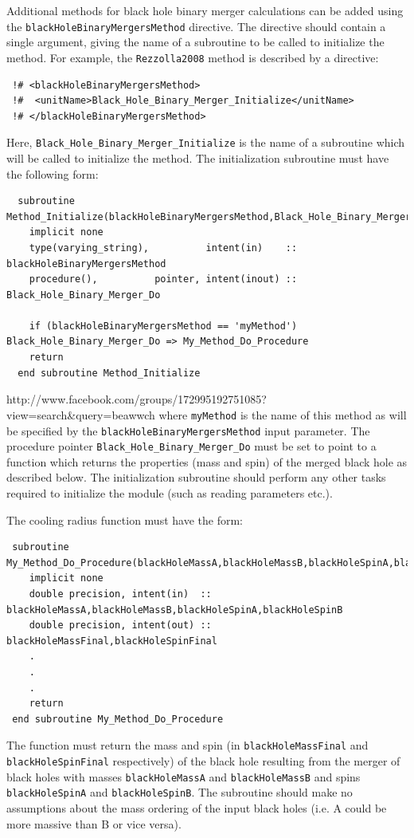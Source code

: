 Additional methods for black hole binary merger calculations can be added using the {\tt blackHoleBinaryMergersMethod} directive. The directive should contain a single argument, giving the name of a subroutine to be called to initialize the method. For example, the {\tt Rezzolla2008} method is described by a directive:
\begin{verbatim}
 !# <blackHoleBinaryMergersMethod>
 !#  <unitName>Black_Hole_Binary_Merger_Initialize</unitName>
 !# </blackHoleBinaryMergersMethod>
\end{verbatim}
Here, {\tt Black\_Hole\_Binary\_Merger\_Initialize} is the name of a subroutine which will be called to initialize the method. The initialization subroutine must have the following form:
\begin{verbatim}
  subroutine Method_Initialize(blackHoleBinaryMergersMethod,Black_Hole_Binary_Merger_Do)
    implicit none
    type(varying_string),          intent(in)    :: blackHoleBinaryMergersMethod
    procedure(),          pointer, intent(inout) :: Black_Hole_Binary_Merger_Do
    
    if (blackHoleBinaryMergersMethod == 'myMethod') Black_Hole_Binary_Merger_Do => My_Method_Do_Procedure
    return
  end subroutine Method_Initialize
\end{verbatim}http://www.facebook.com/groups/172995192751085?view=search&query=beawwch
where {\tt myMethod} is the name of this method as will be specified by the {\tt blackHoleBinaryMergersMethod} input parameter. The procedure pointer {\tt Black\_Hole\_Binary\_Merger\_Do} must be set to point to a function which returns the properties (mass and spin) of the merged black hole as described below. The initialization subroutine should perform any other tasks required to initialize the module (such as reading parameters etc.).

The cooling radius function must have the form:
\begin{verbatim}
 subroutine My_Method_Do_Procedure(blackHoleMassA,blackHoleMassB,blackHoleSpinA,blackHoleSpinB,blackHoleMassFinal,blackHoleSpinFinal)
    implicit none
    double precision, intent(in)  :: blackHoleMassA,blackHoleMassB,blackHoleSpinA,blackHoleSpinB
    double precision, intent(out) :: blackHoleMassFinal,blackHoleSpinFinal
    .
    .
    .
    return
 end subroutine My_Method_Do_Procedure
\end{verbatim}
The function must return the mass and spin (in {\tt blackHoleMassFinal} and {\tt blackHoleSpinFinal} respectively) of the black hole resulting from the merger of black holes with masses {\tt blackHoleMassA} and {\tt blackHoleMassB} and spins {\tt blackHoleSpinA} and {\tt blackHoleSpinB}. The subroutine should make no assumptions about the mass ordering of the input black holes (i.e. A could be more massive than B or vice versa).

